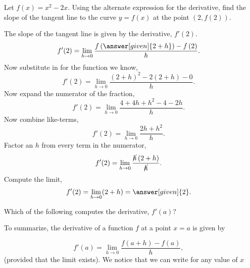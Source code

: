 \documentclass{ximera}
\begin{document}
\begin{example}
 Let $f(x) = x^2-2x$. Using the alternate expression for the derivative, find the slope of the tangent line to the curve $y=f(x)$ at the point $(2,f(2))$.
  \begin{explanation}
   The slope of the tangent line is given by the derivative, $f'(2)$.
    \[
    f'(2) =  \lim_{h\to 0}\frac{f\left(\answer[given]{2+h}\right)-f\left(2\right)}{h}.
    \]
    Now substitute in for the function we know,
    \[
    f'(2) = \lim_{h\to 0}\frac{(2+h)^2-2(2+h) -0}{h}.
    \]
    Now expand the numerator of the fraction,
    \[
     f'(2) =\lim_{h\to 0}  \frac{4+4h+h^2-4-2h }{h}.
    \]
    Now combine like-terms,
    \[
    f'(2) = \lim_{h\to 0} \frac{2h+h^2}{h}.
    \]
    Factor an $h$ from every term in the numerator,
    \[
   f'(2) =  \lim_{h\to 0}\frac{\cancel{h}\left(2+h\right)}{\cancel{h}}.
    \]
  Compute the limit,
    \[
     f'(2) =  \lim_{h\to 0}(2+h)=\answer[given]{2}. 
    \]
  \end{explanation}
\end{example}

\begin{question} 
    Which of the following computes the derivative, $f'(a)$?
    \begin{selectAll}
    \end{selectAll}
\end{question}		
To summarize,
 the derivative of a function $f$ at a point $x=a$ is given by

\[
f'(a) = \lim_{h\to 0}\frac{f(a+h)-f(a)}{h},
\]
(provided that the limit exists).
We notice that we can write for any value of $x$ 
\end{document}
